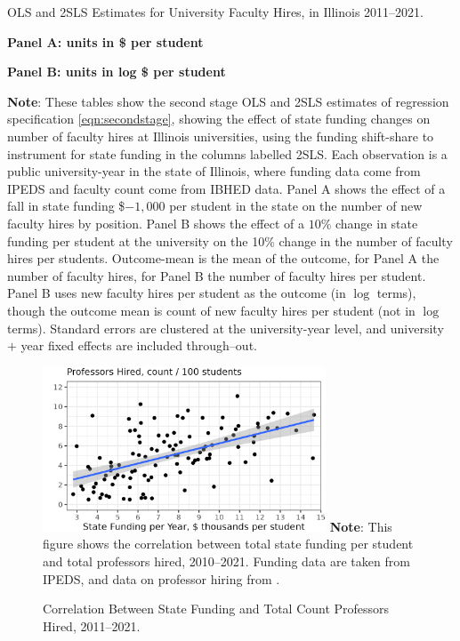 \begin{table}[H]
    \singlespacing
    \centering
    \caption{OLS and 2SLS Estimates for University Faculty Hires, in Illinois 2011--2021.}

    \textbf{Panel A: units in \$ per student}

    \makebox[\textwidth][c]{}
    
    \textbf{Panel B: units in log \$ per student}
    
    \makebox[\textwidth][c]{}
    \label{tab:facultyhires-illinois-reg}
    \vspace{-0.5cm}
    \justify
    \footnotesize
    \textbf{Note}:
    These tables show the second stage OLS and 2SLS estimates of regression specification \eqref{eqn:secondstage}, showing the effect of state funding changes on number of faculty hires at Illinois universities, using the funding shift-share to instrument for state funding in the columns labelled 2SLS.
    Each observation is a public university-year in the state of Illinois, where funding data come from IPEDS and faculty count come from IBHED data.
    Panel A shows the effect of a fall in state funding \$$-1,000$ per student in the state on the number of new faculty hires by position.
    Panel B shows the effect of a $10$\% change in state funding per student at the university on the 10\% change in the number of faculty hires per students.
    Outcome-mean is the mean of the outcome, for Panel A the number of faculty hires, for Panel B the number of faculty hires per student.
    Panel B uses new faculty hires per student as the outcome (in $\log$ terms), though the outcome mean is count of new faculty hires per student (not in $\log$ terms).
    Standard errors are clustered at the university-year level, and university $+$ year fixed effects are included through--out.
\end{table}

\vspace{-0.5cm}
\begin{figure}[H]
    \centering
    \singlespacing
    \caption{Correlation Between State Funding and Total Count Professors Hired, 2011--2021.}
    \includegraphics[width=0.75\textwidth]{figures/hiring-correlation.png}
    \label{fig:hiring-correlation}
    \justify
    \footnotesize
    \textbf{Note}:
    This figure shows the correlation between total state funding per student and total professors hired, 2010--2021.
    Funding data are taken from IPEDS, and data on professor hiring  from \cite{wapman2022quantifying,wapman2022zenodo}.
\end{figure}

